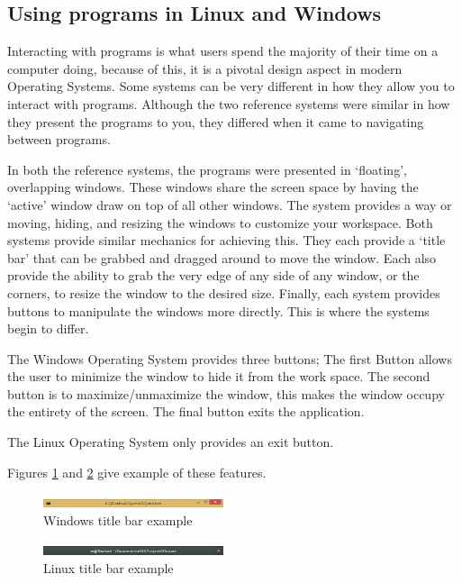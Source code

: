 \documentclass[a4paper]{report}
\begin{document}
\subsection{Using programs in Linux and Windows}

Interacting with programs is what users spend the majority of their time on a computer doing, because of this, it is a pivotal design aspect in modern Operating Systems. Some systems can be very different in how they allow you to interact with programs. Although the two reference systems were similar in how they present the programs to you, they differed when it came to navigating between programs.

In both the reference systems, the programs were presented in `floating', overlapping windows. These windows share the screen space by having the `active' window draw on top of all other windows. The system provides a way or moving, hiding, and resizing the windows to customize your workspace. Both systems provide similar mechanics for achieving this. They each provide a `title bar' that can be grabbed and dragged around to move the window. Each also provide the ability to grab the very edge of any side of any window, or the corners, to resize the window to the desired size. Finally, each system provides buttons to manipulate the windows more directly. This is where the systems begin to differ.

The Windows Operating System provides three buttons; The first Button allows the user to minimize the window to hide it from the work space. The second button is to maximize/unmaximize the window, this makes the window occupy the entirety of the screen. The final button exits the application.

The Linux Operating System only provides an exit button.

Figures \ref{fig:WinTitleBarScreen} and \ref{fig:LinTitleBarScreen} give example of these features.

\begin{figure}[ht]
\centering
\includegraphics[width=200px]{images/Windows_title_bar_screenshot}
\caption{Windows title bar example}
\label{fig:WinTitleBarScreen}
\end{figure}

\begin{figure}[ht]
\centering
\includegraphics[width=200px]{images/Linux_title_bar_screenshot}
\caption{Linux title bar example}
\label{fig:LinTitleBarScreen}
\end{figure}
\end{document}
